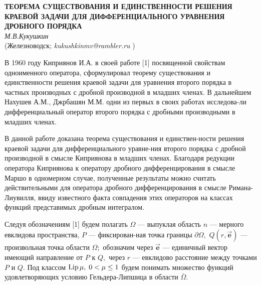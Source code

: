 \begin{center}{ \bf ТЕОРЕМА СУЩЕСТВОВАНИЯ И ЕДИНСТВЕННОСТИ  РЕШЕНИЯ КРАЕВОЙ ЗАДАЧИ ДЛЯ ДИФФЕРЕНЦИАЛЬНОГО УРАВНЕНИЯ ДРОБНОГО ПОРЯДКА}\\
{\it М.В.Кукушкин } \\
(Железноводск; {\it kukushkinmv@rambler.ru} )
\end{center}


  В 1960 году  Киприянов И.А. в своей работе  [1] посвященной свойствам одноименного оператора,
 сформулировал теорему существования и единственности решения краевой задачи для   уравнения  второго порядка в частных производных  с дробной производной в младших членах.
  В дальнейшем   Нахушев А.М., Джрбашян М.М.  одни из первых в своих работах исследова-ли дифференциальный оператор второго порядка с дробными производными в младших членах.

 В данной работе доказана теорема существования и единствен-ности решения краевой задачи для дифференциального уравне-ния второго порядка с дробной производной в смысле Киприянова в младших членах.  Благодаря редукции оператора Киприянова к оператору дробного дифференцирования в смысле Маршо в одномерном случае, полученные результаты можно считать действительными для оператора дробного дифференцирования в смысле Римана-Лиувилля, ввиду известного факта совпадения этих операторов на классах функций представимых дробным интегралом.


  Следуя обозначениям [1] будем полагать $\Omega$ --- выпуклая область $n$ --- мерного евклидова пространства, $P$ --- фиксирован-ная точка границы $\partial\Omega,$
     $Q(r,\vec{\mathbf{e}})$ --- произвольная точка области $\Omega;$
     обозначим через $\vec{\mathbf{e}}$ --- единичный вектор имеющий направление от $P$ к $Q,$ через $r$ --- евклидово расстояние между точками $P$ и $Q.$
    Под классом ${\rm Lip}\, \mu,\;0<\mu\leq1 $ будем понимать множество функций удовлетворяющих условию Гельдера-Липшица в области $\bar{\Omega}.$

